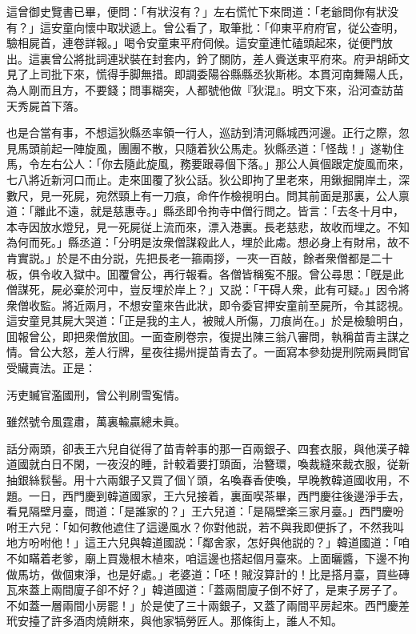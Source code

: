 這曾御史覽書已畢，便問：「有狀沒有？」左右慌忙下來問道：「老爺問你有狀没有？」這安童向懷中取狀遞上。曾公看了，取筆批：「仰東平府府官，従公查明，驗相屍首，連卷詳報。」喝令安童東平府伺候。這安童連忙磕頭起來，従便門放出。這裏曾公將批詞連狀裝在封套内，鈐了關防，差人賫送東平府來。府尹胡師文見了上司批下來，慌得手脚無措。即調委陽谷縣縣丞狄斯彬。本貫河南舞陽人氏，為人剛而且方，不要錢；問事糊突，人都號他做『狄混』。明文下來，沿河查訪苗天秀屍首下落。

也是合當有事，不想這狄縣丞率領一行人，巡訪到清河縣城西河邊。正行之際，忽見馬頭前起一陣旋風，團團不散，只隨着狄公馬走。狄縣丞道：「怪哉！」遂勒住馬，令左右公人：「你去隨此旋風，務要跟尋個下落。」那公人眞個跟定旋風而來，七八將近新河口而止。走來囬覆了狄公話。狄公即拘了里老來，用鍬掘開岸土，深數尺，見一死屍，宛然頸上有一刀痕，命仵作檢視明白。問其前面是那裏，公人禀道：「離此不遠，就是慈惠寺。」縣丞即令拘寺中僧行問之。皆言：「去冬十月中，本寺因放水燈兒，見一死屍従上流而來，漂入港裏。長老慈悲，故收而埋之。不知為何而死。」縣丞道：「分明是汝衆僧謀殺此人，埋於此䖏。想必身上有財帛，故不肯實説。」於是不由分説，先把長老一箍兩拶，一夾一百敲，餘者衆僧都是二十板，俱令收入獄中。囬覆曾公，再行報看。各僧皆稱寃不服。曾公尋思：「旣是此僧謀死，屍必棄於河中，豈反埋於岸上？」又説：「干碍人衆，此有可疑。」因令將衆僧收監。將近兩月，不想安童來告此狀，即令委官押安童前至屍所，令其認視。這安童見其屍大哭道：「正是我的主人，被賊人所傷，刀痕尚在。」於是檢驗明白，囬報曾公，即把衆僧放囬。一面查刷卷宗，復提出陳三翁八審問，執稱苗青主謀之情。曾公大怒，差人行牌，星夜往揚州提苗青去了。一面寫本參劾提刑院兩員問官受贜賣法。正是：

\begin{myquote}
汚吏贓官濫國刑，曾公判刷雪寃情。

雖然號令風霆肅，萬裏輸贏總未眞。
\end{myquote}

話分兩頭，卻表王六兒自従得了苗青幹事的那一百兩銀子、四套衣服，與他漢子韓道國就白日不閑，一夜沒的睡，計較着要打頭面，治簪環，喚裁縫來裁衣服，従新抽銀絲䯼髻。用十六兩銀子又買了個丫頭，名喚春香使喚，早晚教韓道國收用，不題。一日，西門慶到韓道國家，王六兒接着，裏面喫茶畢，西門慶往後邊淨手去，看見隔壁月臺，問道：「是誰家的？」王六兒道：「是隔壁楽三家月臺。」西門慶吩咐王六兒：「如何教他遮住了這邊風水？你對他説，若不與我即便拆了，不然我叫地方吩咐他！」這王六兒與韓道國説：「鄰舍家，怎好與他説的？」韓道國道：「咱不如瞞着老爹，廟上買幾根木植來，咱這邊也搭起個月臺來。上面曬醬，下邊不拘做馬坊，做個東淨，也是好處。」老婆道：「呸！賊沒算計的！比是搭月臺，買些磚瓦來蓋上兩間廈子卻不好？」韓道國道：「蓋兩間廈子倒不好了，是東子房子了。不如蓋一層兩間小房罷！」於是使了三十兩銀子，又蓋了兩間平房起來。西門慶差玳安擡了許多酒肉燒餅來，與他家犒勞匠人。那條街上，誰人不知。

